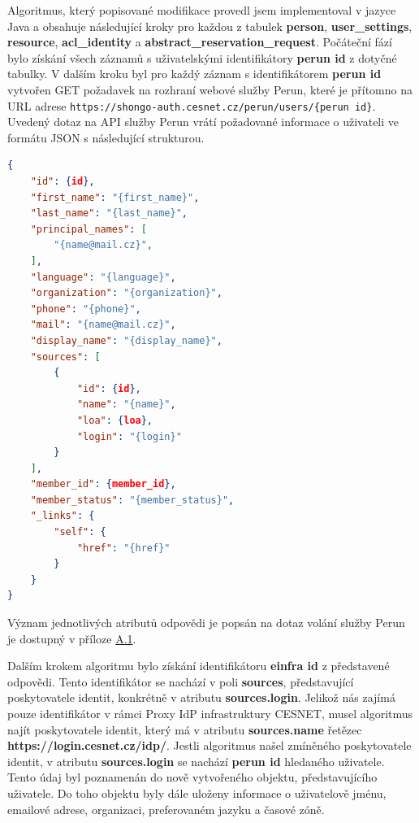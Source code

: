 \documentclass[
  printed, %
  twoside, %
  table,   %
  nolof,     %
  nolot,     %
]{fithesis3}
\begin{document}
Algoritmus, který popisované modifikace provedl jsem implementoval v jazyce Java a obsahuje následující kroky pro každou z tabulek \textbf{person}, \textbf{user\_settings}, \textbf{resource}, \textbf{acl\_identity} a \textbf{abstract\_reservation\_request}. Počáteční fází bylo získání všech záznamů s uživatelskými identifikátory \textbf{perun id} z dotyčné tabulky. V dalším kroku byl pro každý záznam s identifikátorem \textbf{perun id} vytvořen GET požadavek na rozhraní webové služby Perun, které je přítomno na URL adrese \texttt{https://shongo-auth.cesnet.cz/perun/users/\{perun id\}}. Uvedený dotaz na API služby Perun vrátí požadované informace o uživateli ve formátu JSON s následující strukturou.
\begin{lstlisting}[language=json,firstnumber=1]
{
    "id": {id},
    "first_name": "{first_name}",
    "last_name": "{last_name}",
    "principal_names": [
        "{name@mail.cz}",
    ],
    "language": "{language}",
    "organization": "{organization}",
    "phone": "{phone}",
    "mail": "{name@mail.cz}",
    "display_name": "{display_name}",
    "sources": [
        {
            "id": {id},
            "name": "{name}",
            "loa": {loa},
            "login": "{login}"
        }
    ],
    "member_id": {member_id},
    "member_status": "{member_status}",
    "_links": {
        "self": {
            "href": "{href}"
        }
    }
}
\end{lstlisting}

Význam jednotlivých atributů odpovědi je popsán na dotaz volání služby Perun je dostupný v příloze \hyperref[table:perunws:user]{A.1}. 
\par
Dalším krokem algoritmu bylo získání identifikátoru \textbf{einfra id} z představené odpovědi. Tento identifikátor se nachází v poli \textbf{sources}, představující poskytovatele identit, konkrétně v atributu \textbf{sources.login}. Jelikož nás zajímá pouze identifikátor v rámci Proxy IdP infrastruktury CESNET, musel algoritmus najít poskytovatele identit, který má v atributu \textbf{sources.name} řetězec \textbf{https://login.cesnet.cz/idp/}. Jestli algoritmus našel zmíněného poskytovatele identit, v atributu \textbf{sources.login} se nachází \textbf{perun id} hledaného uživatele. Tento údaj byl poznamenán do nově vytvořeného objektu, představujícího uživatele. Do toho objektu byly dále uloženy informace o uživatelově jménu, emailové adrese, organizaci, preferovaném jazyku a časové zóně. 

\par
\end{document}
